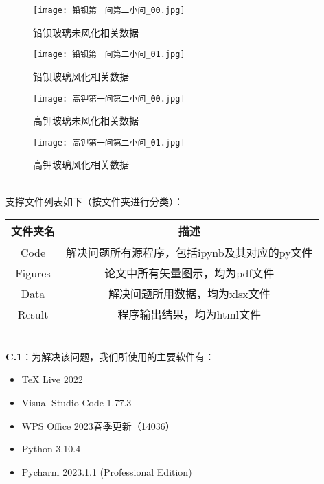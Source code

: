 \documentclass{MathModeling}
\begin{document}
	\begin{figure}[H]
		\centering
		\texttt{[image: 铅钡第一问第二小问\_00.jpg]}
		\caption{铅钡玻璃未风化相关数据}
		\label{铅钡未风化}
	\end{figure}
	\begin{figure}[H]
		\centering
		\texttt{[image: 铅钡第一问第二小问\_01.jpg]}
		\caption{铅钡玻璃风化相关数据}
		\label{铅钡风化}
	\end{figure}
	\begin{figure}[H]
		\centering
		\texttt{[image: 高钾第一问第二小问\_00.jpg]}
		\caption{高钾玻璃未风化相关数据}
		\label{高钾未风化}
	\end{figure}
	\begin{figure}[H]
		\centering
		\texttt{[image: 高钾第一问第二小问\_01.jpg]}
		\caption{高钾玻璃风化相关数据}
		\label{高钾风化}
	\end{figure}	
	
	\newpage
	~\\

	支撑文件列表如下（按文件夹进行分类）：

\begin{table}[H]   
	\centering     
	\begin{tabular}{cc}     
		\toprule     
		\textbf{文件夹名} & \textbf{描述} \\     
		\midrule     
		Code  & 解决问题所有源程序，包括ipynb及其对应的py文件 \\     Figures & 论文中所有矢量图示，均为pdf文件 \\     
		Data  & 解决问题所用数据，均为xlsx文件 \\     
		Result & 程序输出结果，均为html文件 \\     
		\bottomrule     
	\end{tabular}
\end{table}

\newpage
	~\\

	\textbf{C.1}：为解决该问题，我们所使用的主要软件有：
	\begin{itemize}
		\item TeX Live 2022
		\item Visual Studio Code 1.77.3
		\item WPS Office 2023春季更新（14036）
		\item Python 3.10.4
		\item Pycharm 2023.1.1 (Professional Edition)
	\end{itemize}
\end{document}
